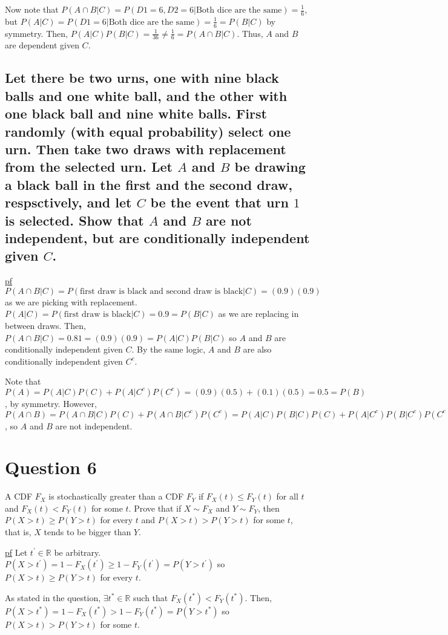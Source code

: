 \documentclass[11pt]{article} %
\begin{document}
Now note that $P(A \cap B|C) = P(D1=6, D2=6|\text{Both dice are the same}) = \frac{1}{6}$, but $P(A|C) = P(D1 = 6|\text{Both dice are the same}) = \frac{1}{6} = P(B|C)$ by symmetry. Then, $P(A|C)P(B|C) = \frac{1}{36} \neq \frac{1}{6} = P(A \cap B|C)$. Thus, $A$ and $B$ are dependent given $C$.

\subsection{Let there be two urns, one with nine black balls and one white ball, and the other with one black ball and nine white balls. First randomly (with equal probability) select one urn. Then take two draws with replacement from the selected urn. Let $A$ and $B$ be drawing a black ball in the first and the second draw, respsctively, and let $C$ be the event that urn $1$ is selected. Show that $A$ and $B$ are not independent, but are conditionally independent given $C$.}

\underline{pf} $P(A\cap B|C) = P(\text{first draw is black and second draw is black}|C) = (0.9)(0.9)$ as we are picking with replacement. $P(A|C)= P(\text{first draw is black}|C) = 0.9 = P(B|C)$ as we are replacing in between draws. Then, $P(A \cap B |C) = 0.81 = (0.9)(0.9) = P(A|C)P(B|C)$ so $A$ and $B$ are conditionally independent given $C$. By the same logic, $A$ and $B$ are also conditionally independent given $C^{c}$.

Note that $P(A) = P(A|C)P(C) +P(A|C^{c})P(C^{c}) = (0.9)(0.5) + (0.1)(0.5) = 0.5 = P(B)$, by symmetry. However, $P(A \cap B) = P(A \cap B|C) P(C) + P(A \cap B|C^{c})P(C^{c}) = P(A|C)P(B|C)P(C) + P(A|C^{c})P(B|C^{c})P(C^{c}) = (0.9)(0.9)(0.5) + (0.1)(0.1)(0.5) = 0.41 \neq 0.25 = (0.5)(0.5) = P(A)P(B)$, so $A$ and $B$ are not independent.

\section{Question 6}
A CDF $F_X$ is stochastically greater than a CDF $F_Y$ if $ F_X(t) \leq F_Y(t)$ for all $t$ and $F_X(t) < F_Y(t)$ for some $t$. Prove that if $X\sim F_X$ and $Y\sim F_Y$, then $P(X>t) \geq P(Y>t)$ for every $t$ and $P(X>t)>P(Y>t)$ for some $t$, that is, $X$ tends to be bigger than $Y$.

\underline{pf} Let $t^{'} \in \mathbb{R}$ be arbitrary. $P(X>t^{'}) = 1 - F_X(t^{'}) \geq 1 - F_Y(t^{'}) = P(Y>t^{'})$ so $P(X>t) \geq P(Y>t)$ for every $t$. 

As stated in the question, $\exists t^{*} \in \mathbb{R}$ such that $F_X(t^{*} ) < F_Y(t^{*} )$. Then, $P(X>t^{*}) = 1 - F_X(t^{*}) > 1 - F_Y(t^{*}) = P(Y>t^{*})$ so $P(X>t)>P(Y>t)$ for some $t$.
\end{document}
